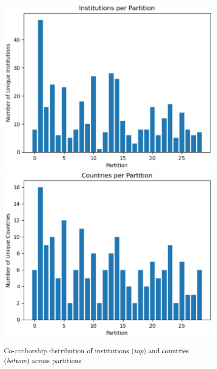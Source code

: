 \documentclass[a4paper, review, endfloat, doubleblind, authoryear]{elsarticle}
\begin{document}
	\begin{figure}[htbp]
		\centering
		\includegraphics[height=0.2\textheight, keepaspectratio]{pics/coauthorship_inst_per_partition.eps}
		\includegraphics[height=0.2\textheight, keepaspectratio]{pics/coauthorship_country_per_partition.eps}
		\caption{Co-authorship distribution of institutions (\textit{top}) and countries (\textit{bottom}) across partitions}\label{fig:fig5}
	\end{figure}
\end{document}
